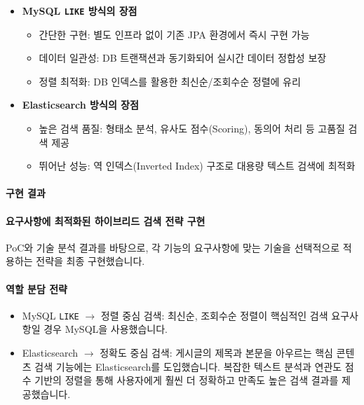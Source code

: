\documentclass[12pt,a4paper]{article}
\begin{document}
    \begin{itemize}
        \item \textbf{MySQL \texttt{LIKE} 방식의 장점}
        \begin{itemize}
            \item 간단한 구현: 별도 인프라 없이 기존 JPA 환경에서 즉시 구현 가능
            \item 데이터 일관성: DB 트랜잭션과 동기화되어 실시간 데이터 정합성 보장
            \item 정렬 최적화: DB 인덱스를 활용한 최신순/조회수순 정렬에 유리
        \end{itemize}
        \vspace{0.5em}
        \item \textbf{Elasticsearch 방식의 장점}
        \begin{itemize}
            \item 높은 검색 품질: 형태소 분석, 유사도 점수(Scoring), 동의어 처리 등 고품질 검색 제공
            \item 뛰어난 성능: 역 인덱스(Inverted Index) 구조로 대용량 텍스트 검색에 최적화
        \end{itemize}
    \end{itemize}



    \paragraph{구현 결과}

    \paragraph{요구사항에 최적화된 하이브리드 검색 전략 구현} \par
    PoC와 기술 분석 결과를 바탕으로, 각 기능의 요구사항에 맞는 기술을 선택적으로 적용하는  전략을 최종 구현했습니다.

    \vspace{1em}
    \paragraph{역할 분담 전략}
    \begin{itemize}
        \item MySQL \texttt{LIKE} \(\rightarrow\) 정렬 중심 검색: 최신순, 조회수순 정렬이 핵심적인 검색 요구사항일 경우 MySQL을 사용했습니다.

        \item Elasticsearch \(\rightarrow\) 정확도 중심 검색: 게시글의 제목과 본문을 아우르는 핵심 콘텐츠 검색 기능에는 Elasticsearch를 도입했습니다. 복잡한 텍스트 분석과 연관도 점수 기반의 정렬을 통해 사용자에게 훨씬 더 정확하고 만족도 높은 검색 결과를 제공했습니다.
    \end{itemize}
\end{document}
